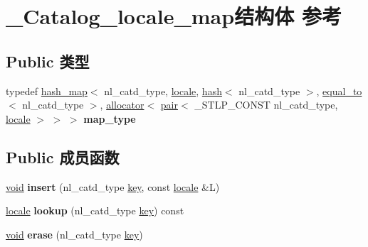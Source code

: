 \hypertarget{struct___catalog__locale__map}{}\section{\+\_\+\+Catalog\+\_\+locale\+\_\+map结构体 参考}
\label{struct___catalog__locale__map}
\subsection*{Public 类型}
\begin{DoxyCompactItemize}
\item 
\mbox{\label{struct___catalog__locale__map_ad5d0038dd436e699a9fcadc9dd0f7b19}} 
typedef \hyperlink{classhash__map}{hash\+\_\+map}$<$ nl\+\_\+catd\+\_\+type, \hyperlink{classlocale}{locale}, \hyperlink{structhash}{hash}$<$ nl\+\_\+catd\+\_\+type $>$, \hyperlink{structequal__to}{equal\+\_\+to}$<$ nl\+\_\+catd\+\_\+type $>$, \hyperlink{classallocator}{allocator}$<$ \hyperlink{structpair}{pair}$<$ \+\_\+\+S\+T\+L\+P\+\_\+\+C\+O\+N\+ST nl\+\_\+catd\+\_\+type, \hyperlink{classlocale}{locale} $>$ $>$ $>$ {\bfseries map\+\_\+type}
\end{DoxyCompactItemize}
\subsection*{Public 成员函数}
\begin{DoxyCompactItemize}
\item 
\mbox{\label{struct___catalog__locale__map_a28eba4f6e9d1bf7afadd5fae94ed1a5f}} 
\hyperlink{interfacevoid}{void} {\bfseries insert} (nl\+\_\+catd\+\_\+type \hyperlink{structkey}{key}, const \hyperlink{classlocale}{locale} \&L)
\item 
\mbox{\label{struct___catalog__locale__map_a7064956adfd894c0a2e2184129e97a0d}} 
\hyperlink{classlocale}{locale} {\bfseries lookup} (nl\+\_\+catd\+\_\+type \hyperlink{structkey}{key}) const
\item 
\mbox{\label{struct___catalog__locale__map_a9fc5930c383369ff0cbd707b6e8b38e3}} 
\hyperlink{interfacevoid}{void} {\bfseries erase} (nl\+\_\+catd\+\_\+type \hyperlink{structkey}{key})
\end{DoxyCompactItemize}
